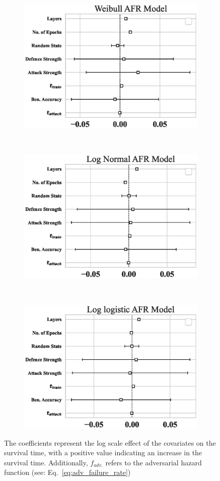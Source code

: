 \begin{figure}[!h]
    \begin{subfigure}
        \centering
        \includegraphics[width=.33\textwidth]{mnist/weibull_aft.eps}
    \end{subfigure}%
    ~
    \begin{subfigure}
        \centering
        \includegraphics[width=.33\textwidth]{mnist/log_normal_aft.eps}
    \end{subfigure}
    ~
    \begin{subfigure}
        \centering
        \includegraphics[width=.33\textwidth]{mnist/log_logistic_aft.eps}
    \end{subfigure}

    \caption{The coefficients represent the log scale effect of the covariates on the survival time, with a positive value indicating an increase in the survival time. Additionally, $f_{adv.}$ refers to the adversarial hazard function (see: Eq.~\ref{eq:adv_failure_rate})}
    \label{fig:mnist_afr_models}
\end{figure}

